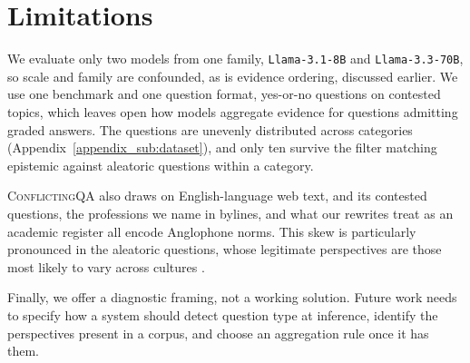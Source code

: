 \section*{Limitations}
\label{sec:limitations}

We evaluate only two models from one family, \texttt{Llama-3.1-8B} and \texttt{Llama-3.3-70B}, so scale and family are confounded, as is evidence ordering, discussed earlier. We use one benchmark and one question format, yes-or-no questions on contested topics, which leaves open how models aggregate evidence for questions admitting graded answers. The questions are unevenly distributed across categories (Appendix~\ref{appendix_sub:dataset}), and only ten survive the filter matching epistemic against aleatoric questions within a category.

\textsc{ConflictingQA} also draws on English-language web text, and its contested questions, the professions we name in bylines, and what our rewrites treat as an academic register all encode Anglophone norms. This skew is particularly pronounced in the aleatoric questions, whose legitimate perspectives are those most likely to vary across cultures \citep{awad2018moral,pmlr-v235-conitzer24a}.

Finally, we offer a diagnostic framing, not a working solution. Future work needs to specify how a system should detect question type at inference, identify the perspectives present in a corpus, and choose an aggregation rule once it has them.
